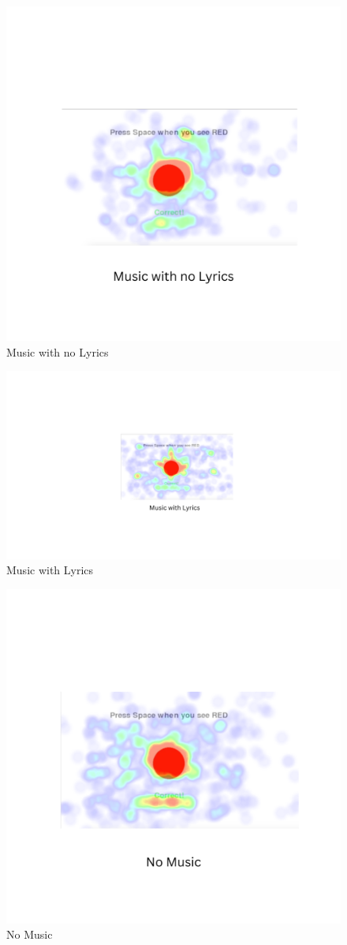 \documentclass[manuscript, screen, review]{acmart} %
\begin{document}
\begin{figure}
    \centering
    \includegraphics[width=0.5\linewidth]{1.png}
    \caption{Music with no Lyrics}
    \label{fig:enter-label}
\end{figure}
\begin{figure}
    \centering
    \includegraphics[width=0.5\linewidth]{Music with Lyrics.png}
    \caption{Music with Lyrics}
    \label{fig:enter-label}
\end{figure}
\begin{figure}
    \centering
    \includegraphics[width=0.5\linewidth]{3.png}
    \caption{No Music}
    \label{fig:enter-label}
\end{figure}




\end{document}

